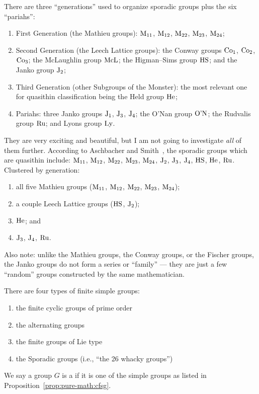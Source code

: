 \begin{def-remark}
There are three ``generations'' used to organize sporadic groups plus
the six ``pariahs'':
\begin{enumerate}
\item First Generation (the Mathieu groups): $\mathrm{M}_{11}$,
  $\mathrm{M}_{12}$, $\mathrm{M}_{22}$, $\mathrm{M}_{23}$, $\mathrm{M}_{24}$;
\item Second Generation (the Leech Lattice groups): the Conway groups
  $\mathrm{Co}_{1}$, $\mathrm{Co}_{2}$, $\mathrm{Co}_{3}$; the McLaughlin group
  $\mathrm{McL}$; the Higman--Sims group $\mathrm{HS}$; and the Janko
  group $\operatorname{J}_{2}$;
\item Third Generation (other Subgroups of the Monster): the most
  relevant one for quasithin classification being the Held group
  $\mathrm{He}$;
\item Pariahs: three Janko groups $\operatorname{J}_{1}$, $\operatorname{J}_{3}$, $\operatorname{J}_{4}$;
  the O'Nan group $\mathrm{O\textrm'N}$; the Rudvalis group $\mathrm{Ru}$; and Lyons
  group $\mathrm{Ly}$.
\end{enumerate}
They are very exciting and beautiful, but I am not going to investigate
\emph{all} of them further. According to Aschbacher and Smith~\cite{aschbacher2004classification1,aschbacher2004classification2}, the
sporadic groups which are quasithin include:
$\mathrm{M}_{11}$, $\mathrm{M}_{12}$, $\mathrm{M}_{22}$,
$\mathrm{M}_{23}$, $\mathrm{M}_{24}$, $\operatorname{J}_{2}$, $\operatorname{J}_{3}$, $\operatorname{J}_{4}$,
$\mathrm{HS}$, $\mathrm{He}$, $\mathrm{Ru}$. Clustered by generation:
\begin{enumerate}
\item all five Mathieu groups ($\mathrm{M}_{11}$, $\mathrm{M}_{12}$, $\mathrm{M}_{22}$, $\mathrm{M}_{23}$,
  $\mathrm{M}_{24}$);
\item a couple Leech Lattice groups ($\mathrm{HS}$, $\operatorname{J}_{2}$);
\item $\mathrm{He}$; and
\item $\operatorname{J}_{3}$, $\operatorname{J}_{4}$, $\mathrm{Ru}$.
\end{enumerate}
Also note: unlike the Mathieu groups, the Conway groups, or the Fischer
groups, the Janko groups do not form a series or ``family'' --- they are
just a few ``random'' groups constructed by the same mathematician.
\end{def-remark}

\begin{proposition}\label{prop:pure-math:cfsg}
There are four types of finite simple groups:
\begin{enumerate}
\item the finite cyclic groups of prime order
\item the alternating groups
\item the finite groups of Lie type
\item the Sporadic groups (i.e., ``the 26 whacky groups'')
\end{enumerate}
\end{proposition}

\begin{definition}
We say a group $G$ is a  if it is one of the
simple groups as listed in Proposition~\ref{prop:pure-math:cfsg}.
\end{definition}
